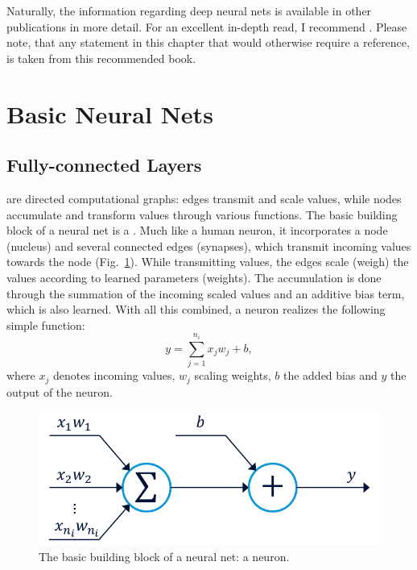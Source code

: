 	Naturally, the information regarding deep neural nets is available in other publications in more detail.
	For an excellent in-depth read, I recommend \cite{deep_learning_book}.
	Please note, that any statement in this chapter that would otherwise require a reference, is taken from this recommended book.
	
	\section{Basic Neural Nets}
	
		\subsection{Fully-connected Layers}
	
			 are directed computational graphs: edges transmit and scale values, while nodes accumulate and transform values through various functions.
			The basic building block of a neural net is a .
			Much like a human neuron, it incorporates a node (nucleus) and several connected edges (synapses), which transmit incoming values towards the node (Fig.~\ref{fig:neuron}).
			While transmitting values, the edges scale (weigh) the values according to learned parameters (weights).
			The accumulation is done through the summation of the incoming scaled values and an additive bias term, which is also learned.
			With all this combined, a neuron realizes the following simple function:
			\begin{equation}
				\label{eq:neuron}
				y = \sum_{j=1}^{n_i} x_{j}w_{j} + b,
			\end{equation}
			\noindent where $x_j$ denotes incoming values, $w_j$ scaling weights, $b$ the added bias and $y$ the output of the neuron.
			
			\begin{figure}[ht]
				\centering
				\includegraphics[width=0.46\linewidth]{figures/02_deep_learning/neuron/neuron.pdf}
				\caption[Neuron]{The basic building block of a neural net: a neuron.}
				\label{fig:neuron}
			\end{figure}
			

